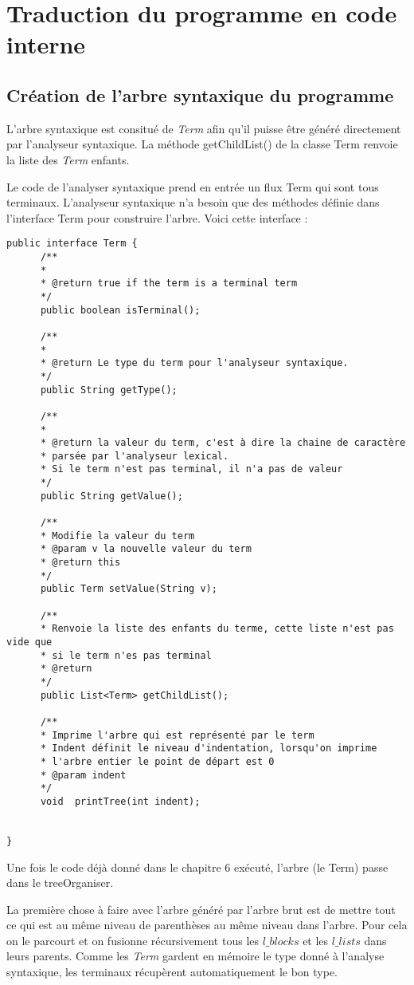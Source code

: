 \section{Traduction du programme en code interne}
\subsection{Création de l'arbre syntaxique du programme}
L'arbre syntaxique est consitué de \emph{Term} afin
qu'il puisse être généré directement par l'analyseur syntaxique. 
La méthode getChildList() de la classe Term renvoie la liste des \emph{Term} enfants.


Le code de l'analyser syntaxique prend en entrée un flux Term qui sont tous terminaux. 
L'analyseur syntaxique n'a besoin que des méthodes définie dans l'interface Term pour construire l'arbre.
Voici cette interface : 
\begin{verbatim}
public interface Term {
	  /**
	  * 
	  * @return true if the term is a terminal term
	  */
	  public boolean isTerminal();
	  
	  /**
	  * 
	  * @return Le type du term pour l'analyseur syntaxique.
	  */
	  public String getType();
	
	  /**
	  * 
	  * @return la valeur du term, c'est à dire la chaine de caractère
	  * parsée par l'analyseur lexical.
	  * Si le term n'est pas terminal, il n'a pas de valeur
	  */
	  public String getValue();
	
	  /**
	  * Modifie la valeur du term
	  * @param v la nouvelle valeur du term
	  * @return this
	  */
	  public Term setValue(String v);
	
	  /**
	  * Renvoie la liste des enfants du terme, cette liste n'est pas vide que
	  * si le term n'es pas terminal
	  * @return
	  */
	  public List<Term> getChildList();
	
	  /**
	  * Imprime l'arbre qui est représenté par le term
	  * Indent définit le niveau d'indentation, lorsqu'on imprime
	  * l'arbre entier le point de départ est 0
	  * @param indent
	  */
	  void	printTree(int indent);
	
	
}
\end{verbatim}


Une fois le code déjà donné dans le chapitre 6 exécuté, l'arbre (le Term) passe dans le treeOrganiser.

La première chose à faire avec l'arbre généré par l'arbre brut est
de mettre tout ce qui est au même niveau de parenthèses au même niveau
dans l'arbre. Pour cela on le parcourt et on fusionne récursivement tous
les $l\_blocks$ et les $l\_lists$ dans leurs parents. Comme les \emph{Term}
gardent en mémoire le type donné à l'analyse syntaxique, les terminaux
récupèrent automatiquement le bon type. 
 
